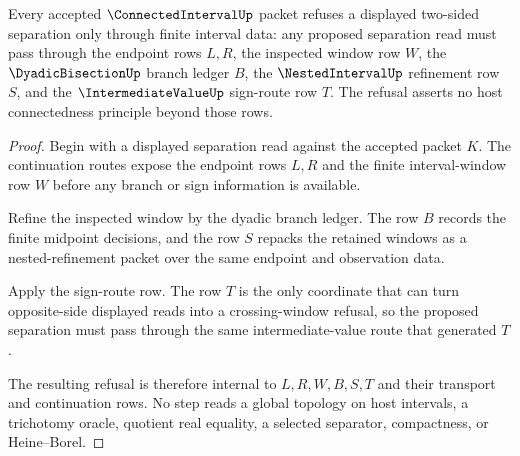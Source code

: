 \begin{theorem}
\label{thm:connected-interval-separation-refusal}
Every accepted $\ConnectedIntervalUp$ packet refuses a displayed two-sided separation only through finite interval data: any proposed separation read must pass through the endpoint rows $L,R$, the inspected window row $W$, the $\DyadicBisectionUp$ branch ledger $B$, the $\NestedIntervalUp$ refinement row $S$, and the $\IntermediateValueUp$ sign-route row $T$. The refusal asserts no host connectedness principle beyond those rows.
\end{theorem}
\begin{proof}
Begin with a displayed separation read against the accepted packet $K$. The continuation routes expose the endpoint rows $L,R$ and the finite interval-window row $W$ before any branch or sign information is available.

Refine the inspected window by the dyadic branch ledger. The row $B$ records the finite midpoint decisions, and the row $S$ repacks the retained windows as a nested-refinement packet over the same endpoint and observation data.

Apply the sign-route row. The row $T$ is the only coordinate that can turn opposite-side displayed reads into a crossing-window refusal, so the proposed separation must pass through the same intermediate-value route that generated $T$.

The resulting refusal is therefore internal to $L,R,W,B,S,T$ and their transport and continuation rows. No step reads a global topology on host intervals, a trichotomy oracle, quotient real equality, a selected separator, compactness, or Heine--Borel.
\end{proof}

